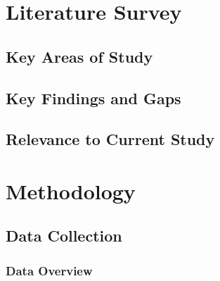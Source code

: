 \documentclass[12pt]{article}
\begin{document}


\section{Literature Survey}


\subsection{Key Areas of Study}

\subsection{Key Findings and Gaps}

\subsection{Relevance to Current Study}


\section{Methodology}
\subsection{Data Collection}

\subsubsection{Data Overview}


\end{document}
